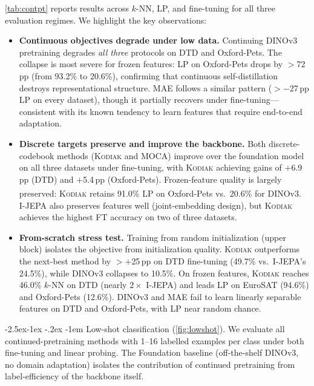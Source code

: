 \documentclass[runningheads]{llncs}
\makeatletter
\newcommand{\method}{\textsc{Kodiak}}
\newcommand{\globe}{\footnotesize{\faGlobe}\normalsize}
\newcommand{\csym}{\textsuperscript{\textdaggerdbl}}
\renewcommand\paragraph{\@startsection{paragraph}{4}{\z@}%
  {-2.5ex\@plus -1ex \@minus -.2ex}%
  {-1em}%
  {\normalfont\normalsize\bfseries}}
\makeatother
\begin{document}
\cref{tab:contpt} reports results across $k$-NN, LP, and fine-tuning for all three evaluation regimes.
We highlight the key observations:
\begin{itemize}[nosep,leftmargin=*]
    \item \textbf{Continuous objectives degrade under low data.}
    Continuing DINOv3 pretraining degrades \emph{all three} protocols on DTD and Oxford-Pets.
    The collapse is most severe for frozen features: LP on Oxford-Pets drops by $>$72\,pp (from 93.2\% to 20.6\%), confirming that continuous self-distillation destroys representational structure.
    MAE follows a similar pattern ($>$$-$27\,pp LP on every dataset), though it partially recovers under fine-tuning---consistent with its known tendency to learn features that require end-to-end adaptation.

    \item \textbf{Discrete targets preserve and improve the backbone.}
    Both discrete-codebook methods (\method{} and MOCA) improve over the foundation model on all three datasets under fine-tuning, with \method{} achieving gains of $+$6.9\,pp (DTD) and $+$5.4\,pp (Oxford-Pets).
    Frozen-feature quality is largely preserved: \method{} retains 91.0\% LP on Oxford-Pets vs.\ 20.6\% for DINOv3\csym{}.
    I-JEPA also preserves features well (joint-embedding design), but \method{} achieves the highest FT accuracy on two of three datasets.

    \item \textbf{From-scratch stress test.}
    Training from random initialization (upper block) isolates the objective from initialization quality.
    \method{} outperforms the next-best method by $>$$+$25\,pp on DTD fine-tuning (49.7\% vs.\ I-JEPA's 24.5\%), while DINOv3 collapses to 10.5\%.
    On frozen features, \method{} reaches 46.0\% $k$-NN on DTD (nearly $2{\times}$ I-JEPA) and leads LP on EuroSAT (94.6\%) and Oxford-Pets (12.6\%).
    DINOv3 and MAE fail to learn linearly separable features on DTD and Oxford-Pets, with LP near random chance.
\end{itemize}

\paragraph{Low-shot classification (\cref{fig:lowshot}).}
We evaluate all continued-pretraining methods with 1--16 labelled examples per class under both fine-tuning and linear probing.
The \globe\;Foundation baseline (off-the-shelf DINOv3, no domain adaptation) isolates the contribution of continued pretraining from label-efficiency of the backbone itself.
\end{document}
